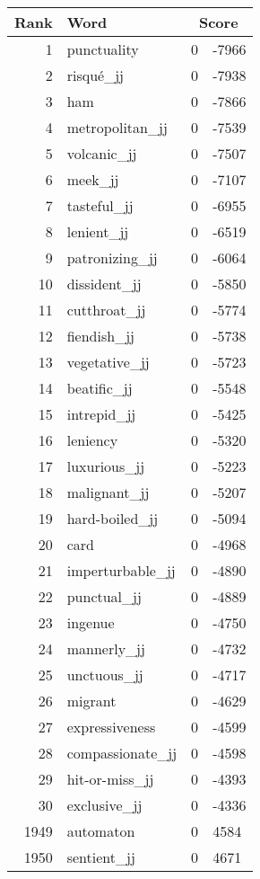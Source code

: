 \begin{longtable}[!htbp]{| rlr@{.}l |}
    \hline
    \textbf{Rank} & \textbf{Word} & \multicolumn{2}{c|}{\textbf{Score}} \\
    \hline
    \endhead
    1 & punctuality & 0 & -7966 \\
    2 & risqué\_jj & 0 & -7938 \\
    3 & ham & 0 & -7866 \\
    4 & metropolitan\_jj & 0 & -7539 \\
    5 & volcanic\_jj & 0 & -7507 \\
    6 & meek\_jj & 0 & -7107 \\
    7 & tasteful\_jj & 0 & -6955 \\
    8 & lenient\_jj & 0 & -6519 \\
    9 & patronizing\_jj & 0 & -6064 \\
    10 & dissident\_jj & 0 & -5850 \\
    11 & cutthroat\_jj & 0 & -5774 \\
    12 & fiendish\_jj & 0 & -5738 \\
    13 & vegetative\_jj & 0 & -5723 \\
    14 & beatific\_jj & 0 & -5548 \\
    15 & intrepid\_jj & 0 & -5425 \\
    16 & leniency & 0 & -5320 \\
    17 & luxurious\_jj & 0 & -5223 \\
    18 & malignant\_jj & 0 & -5207 \\
    19 & hard-boiled\_jj & 0 & -5094 \\
    20 & card & 0 & -4968 \\
    21 & imperturbable\_jj & 0 & -4890 \\
    22 & punctual\_jj & 0 & -4889 \\
    23 & ingenue & 0 & -4750 \\
    24 & mannerly\_jj & 0 & -4732 \\
    25 & unctuous\_jj & 0 & -4717 \\
    26 & migrant & 0 & -4629 \\
    27 & expressiveness & 0 & -4599 \\
    28 & compassionate\_jj & 0 & -4598 \\
    29 & hit-or-miss\_jj & 0 & -4393 \\
    30 & exclusive\_jj & 0 & -4336 \\
    1949 & automaton & 0 & 4584 \\
    1950 & sentient\_jj & 0 & 4671 \\

\end{longtable}
